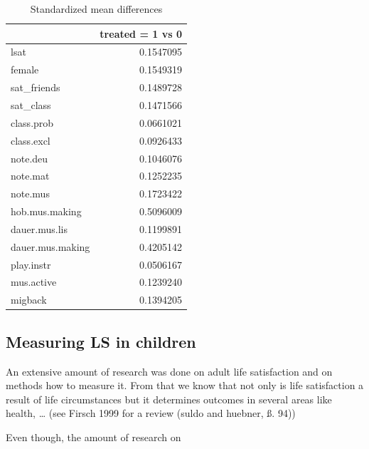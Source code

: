 \documentclass[a4, 12pt]{article}
\begin{document}
\begin{table}

\caption{\label{tab:std-mean-diff}Standardized mean differences}
\centering
\begin{tabular}[t]{lr}
\toprule
  & treated = 1 vs 0\\
\midrule
lsat & 0.1547095\\
female & 0.1549319\\
sat\_friends & 0.1489728\\
sat\_class & 0.1471566\\
class.prob & 0.0661021\\
\addlinespace
class.excl & 0.0926433\\
note.deu & 0.1046076\\
note.mat & 0.1252235\\
note.mus & 0.1723422\\
hob.mus.making & 0.5096009\\
\addlinespace
dauer.mus.lis & 0.1199891\\
dauer.mus.making & 0.4205142\\
play.instr & 0.0506167\\
mus.active & 0.1239240\\
migback & 0.1394205\\
\bottomrule
\end{tabular}
\end{table}

\hypertarget{measuring-ls-in-children}{%
\subsection{Measuring LS in children}\label{measuring-ls-in-children}}

\label{sec:measurement}
An extensive amount of research was done on adult life satisfaction and on methods how to measure it. From that we know that not only is life satisfaction a result of life circumstances but it determines outcomes in several areas like health, \ldots{} (see Firsch 1999 for a review (suldo and huebner, ß. 94))

Even though, the amount of research on
\end{document}
